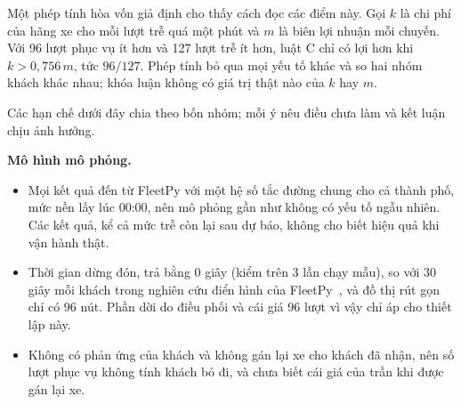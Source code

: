 Một phép tính hòa vốn giả định cho thấy cách đọc các điểm này. Gọi $k$ là chi phí của hãng xe cho mỗi lượt trễ quá một
phút và $m$ là biên lợi nhuận mỗi chuyến. Với 96 lượt phục vụ ít hơn và 127 lượt trễ ít hơn, luật C chỉ có lợi hơn khi
$k > 0{,}756\,m$, tức $96/127$. Phép tính bỏ qua mọi yếu tố khác và so hai nhóm khách khác nhau; khóa luận không có giá trị thật
nào của $k$ hay $m$.

Các hạn chế dưới đây chia theo bốn nhóm; mỗi ý nêu điều chưa làm và kết luận chịu ảnh hưởng.

\textbf{Mô hình mô phỏng.}
\begin{itemize}[leftmargin=1.2cm,itemsep=2pt,topsep=3pt]
\item Mọi kết quả đến từ FleetPy với một hệ số tắc đường chung cho cả thành phố, mức nền lấy lúc 00:00, nên mô phỏng gần
như không có yếu tố ngẫu nhiên. Các kết quả, kể cả mức trễ còn lại sau dự báo, không cho biết hiệu quả khi vận hành thật.
\item Thời gian dừng đón, trả bằng 0 giây (kiểm trên 3 lần chạy mẫu), so với 30 giây mỗi khách trong nghiên cứu điển hình
của FleetPy~\cite{engelhardt2026}, và đồ thị rút gọn chỉ có 96 nút. Phần dời do điều phối và cái giá 96 lượt vì vậy chỉ áp cho
thiết lập này.
\item Không có phản ứng của khách và không gán lại xe cho khách đã nhận, nên số lượt phục vụ không tính khách bỏ đi, và
chưa biết cái giá của trần khi được gán lại xe.
\end{itemize}


